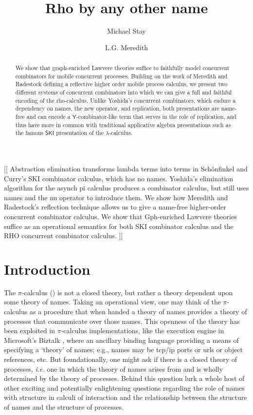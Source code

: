 \documentclass{llncs}
\title{Rho by any other name}
\author{
Michael Stay\inst{1}\\
\and
L.G. Meredith\inst{2}\\
}
\institute{
  {Pyrofex Corp.}\\
  \email{\fontsize{8}{8}\selectfont stay@pyrofex.net}\\
  \and
  {RChain Cooperative}\\
  \email{\fontsize{8}{8}\selectfont greg@rchain.coop}
}
\newcommand{\pic}{$\pi$-calculus}
\begin{document}
\maketitle
\begin{abstract}
\noindent
  We show that graph-enriched Lawvere theories suffice to faithfully
  model concurrent combinators for mobile concurrent
  processes. Building on the work of Meredith and Radestock
  \cite{DBLP:journals/entcs/MeredithR05} defining a reflective higher
  order mobile process calculus, we present two different systems of
  concurrent combinators into which we can give a full and faithful
  encoding of the rho-calculus. Unlike Yoshida's concurrent
  combinators, which endure a dependency on names, the new operator,
  and replication, both presentations are name-free and can encode a
  $\mathsf{Y}$-combinator-like term that serves in the role of
  replication, and thus have more in common with traditional
  applicative algebra presentations such as the famous $\mathsf{SKI}$
  presentation of the $\lambda$-calculus.

\end{abstract}

[[
Abstraction elimination transforms lambda terms into terms in Schönfinkel and Curry's SKI combinator calculus, which has no names.  Yoshida's elimination algorithm for the asynch pi calculus produces a combinator calculus, but still uses names and the nu operator to introduce them.  We show how Meredith and Radestock's reflection technique allows us to give a name-free higher-order concurrent combinator calculus.  We show that Gph-enriched Lawvere theories suffice as an operational semantics for both SKI combinator calculus and the RHO concurrent combinator calculus.
]]

\section{Introduction}
  
  The {\pic} (\cite{milner91polyadicpi}) is not a closed theory, but
rather a theory dependent upon some theory of names. Taking an
operational view, one may think of the {\pic} as a procedure that when
handed a theory of names provides a theory of processes that
communicate over those names. This openness of the theory has been
exploited in {\pic} implementations, like the execution engine in
Microsoft's Biztalk \cite{biztalk}, where an ancillary binding
language providing a means of specifying a `theory' of names; e.g.,
names may be tcp/ip ports or urls or object references, etc. But
foundationally, one might ask if there is a closed theory of
processes, {\em i.e.} one in which the theory of names arises from and is
wholly determined by the theory of processes. Behind this question
lurk a whole host of other exciting and potentially enlightening
questions regarding the role of names with structure in calculi of
interaction and the relationship between the structure of names and
the structure of processes.
\end{document}
